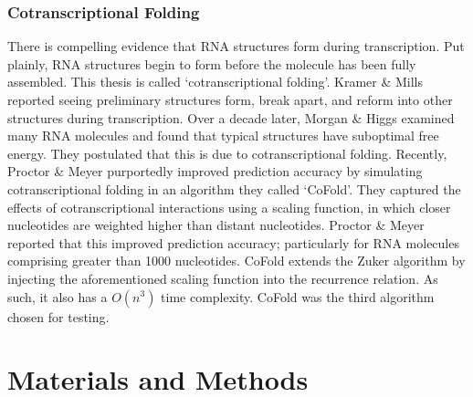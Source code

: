 \documentclass[12pt, a4paper]{article}
\begin{document}
\subsubsection{Cotranscriptional Folding}
There is compelling evidence that RNA structures form during transcription. Put plainly, RNA structures begin to form before the molecule has been fully assembled. This thesis is called `cotranscriptional folding'. Kramer \& Mills \cite{kramer1981secondary} reported seeing preliminary structures form, break apart, and reform into other structures during transcription. Over a decade later, Morgan \& Higgs \cite{morgan1996evidence} examined many RNA molecules and found that typical structures have suboptimal free energy. They postulated that this is due to cotranscriptional folding. Recently, Proctor \& Meyer \cite{proctor2013cofold} purportedly improved prediction accuracy by simulating cotranscriptional folding in an algorithm they called `CoFold'. They captured the effects of cotranscriptional interactions using a scaling function, in which closer nucleotides are weighted higher than distant nucleotides. Proctor \& Meyer \cite{proctor2013cofold} reported that this improved prediction accuracy; particularly for RNA molecules comprising greater than 1000 nucleotides. CoFold extends the Zuker algorithm by injecting the aforementioned scaling function into the recurrence relation. As such, it also has a $O(n^3)$ time complexity. CoFold was the third algorithm chosen for testing.

\section{Materials and Methods}
\end{document}
